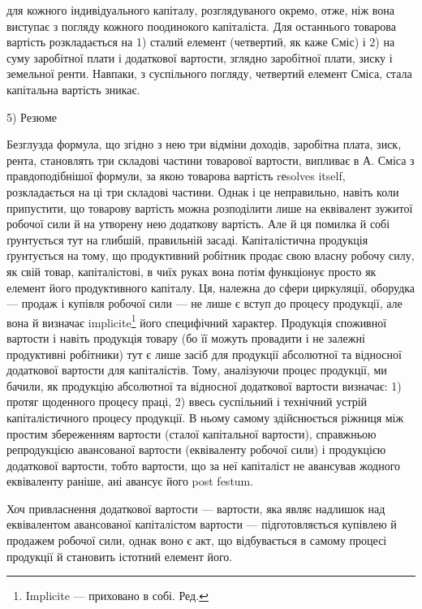 \parcont{}  %
для кожного індивідуального капіталу, розглядуваного окремо, отже, ніж
вона виступає з погляду кожного поодинокого капіталіста. Для останнього
товарова вартість розкладається на 1) сталий елемент (четвертий,
як каже Сміс) і 2) на суму заробітної плати і додаткової вартости, зглядно
заробітної плати, зиску і земельної ренти. Навпаки, з суспільного погляду,
четвертий елемент Сміса, стала капітальна вартість зникає.

5) Резюме

Безглузда формула, що згідно з нею три відміни доходів, заробітна
плата, зиск, рента, становлять три складові частини товарової вартости,
випливає в А. Сміса з правдоподібнішої формули, за якою товарова
вартість rеsolves itself, розкладається на ці три складові частини. Однак
і це неправильно, навіть коли припустити, що товарову вартість можна
розподілити лише на еквівалент зужитої робочої сили й на утворену
нею додаткову вартість. Але й ця помилка й собі ґрунтується тут на
глибшій, правильній засаді. Капіталістична продукція ґрунтується на тому,
що продуктивний робітник продає свою власну робочу силу, як свій
товар, капіталістові, в чиїх руках вона потім функціонує просто як елемент
його продуктивного капіталу. Ця, належна до сфери циркуляції,
оборудка — продаж і купівля робочої сили — не лише є вступ до процесу
продукції, але вона й визначає implicite\footnote*{
Implicite — приховано в собі. Ред.
} його специфічний характер.
Продукція споживної вартости і навіть продукція товару (бо її можуть
провадити і не залежні продуктивні робітники) тут є лише засіб для продукції
абсолютної та відносної додаткової вартости для капіталістів. Тому, аналізуючи
процес продукції, ми бачили, як продукцію абсолютної та відносної
додаткової вартости визначає: 1) протяг щоденного процесу праці,
2) ввесь суспільний і технічний устрій капіталістичного процесу продукції.
В ньому самому здійснюється ріжниця між простим збереженням вартости
(сталої капітальної вартости), справжньою репродукцією авансованої вартости
(еквіваленту робочої сили) і продукцією додаткової вартости, тобто
вартости, що за неї капіталіст не авансував жодного еквіваленту раніше,
ані авансує його post festum.

Хоч привласнення додаткової вартости — вартости, яка являє надлишок
над еквівалентом авансованої капіталістом вартости — підготовляється
купівлею й продажем робочої сили, однак воно є акт, що відбувається
в самому процесі продукції й становить істотний елемент його.

